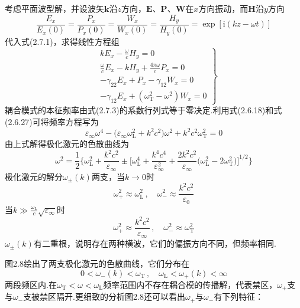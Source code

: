 考虑平面波型解，并设波矢$\boldsymbol{k}$沿$z$方向，$\boldsymbol{E}$、$\boldsymbol{P}$、$\boldsymbol{W}$在$x$方向振动，而$\boldsymbol{H}$沿$y$方向
\begin{equation}
  \frac{E_x}{E_x(0)}=\frac{P_x}{P_x(0)}=\frac{W_x}{W_x(0)}
  =\frac{H_y}{H_y(0)}=\exp[\mathrm{i}(kz-\omega t)]
\end{equation}
代入式(2.7.1)，求得线性方程组
\begin{equation}
\left.\begin{aligned}
  &kE_x-\frac{\omega}{c}H_y=0\\
  &\frac{\omega}{c}E_x-kH_y+\frac{4\pi\omega}{c}P_x=0\\
  &-\gamma_{22}E_x+P_x-\gamma_{12}W_x=0\\
  &-\gamma_{12}E_x+(\omega_{\mathrm{T}}^2-\omega^2)W_x=0
\end{aligned}\right\}
\end{equation}
耦合模式的本征频率由式(2.7.3)的系数行列式等于零决定.利用式(2.6.18)和式(2.6.27)可将频率方程写为
\begin{equation}
  \varepsilon_{\infty}\omega^4
  -\bigl(\varepsilon_{\infty}\omega_{\mathrm{L}}^2+k^2c^2\bigr)\omega^2
  +k^2c^2\omega_{\mathrm{T}}^2=0
\end{equation}
由上式解得极化激元的色散曲线为
\begin{equation}
  \omega^2=\frac{1}{2}\Biggl\{\omega_{\mathrm{L}}^2+\frac{k^2c^2}{\varepsilon_{\infty}}
  \pm\biggl[\omega_{\mathrm{L}}^4+\frac{k^4c^4}{\varepsilon_{\infty}^2}
  +\frac{2k^2c^2}{\varepsilon_{\infty}}\bigl(\omega_{\mathrm{L}}^2-2\omega_{\mathrm{T}}^2\bigr)
  \biggr]^{1/2}\Biggr\}
\end{equation}
极化激元的解分$\omega_{\pm}(k)$两支，当$k\to0$时
\begin{equation}
  \omega_{+}^2\approx\omega_{\mathrm{L}}^2\,,\quad
  \omega_{-}^2\approx\frac{k^2c^2}{\varepsilon_0}
\end{equation}
当$k\gg\frac{\omega_{\mathrm{L}}}{c}\sqrt{\varepsilon_{\infty}}$时
\begin{equation}
  \omega_{+}^2\approx\frac{k^2c^2}{\varepsilon_{\infty}}\,,\quad
  \omega_{-}^2\approx\omega_{\mathrm{T}}^2
\end{equation}
$\omega_{\pm}(k)$有二重根，说明存在两种横波，它们的偏振方向不同，但频率相同.

图2.8绘出了两支极化激元的色散曲线，它们分布在
\begin{equation*}
  0<\omega_-(k)<\omega_{\mathrm{T}}\,,\quad
  \omega_{\mathrm{L}}<\omega_+(k)<\infty
\end{equation*}
两段频区内.在$\omega_{\mathrm{T}}<\omega<\omega_{\mathrm{L}}$频率范围内不存在耦合模的传播解，代表禁区，$\omega_+$支与$\omega_-$支被禁区隔开.更细致的分析图2.8还可以看出$\omega_+$与$\omega_-$有下列特征：

